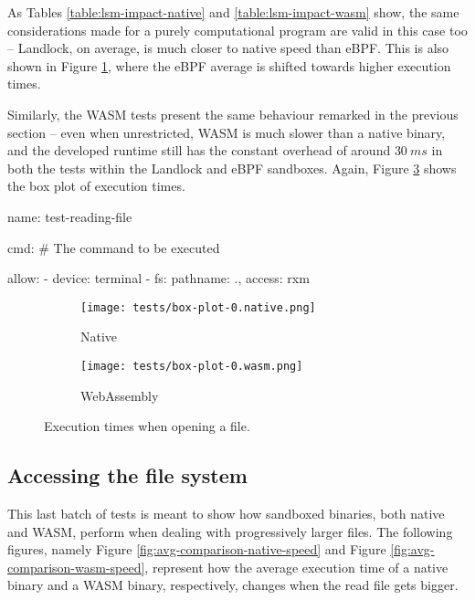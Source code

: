 As Tables \ref{table:lsm-impact-native} and \ref{table:lsm-impact-wasm} show,
the same considerations made for a purely computational program are valid in this case too
-- Landlock, on average, is much closer to native speed than eBPF.
This is also shown in Figure \ref{fig:distribution-opening-native}, where the eBPF average is shifted towards
higher execution times.

Similarly, the WASM tests present the same behaviour remarked in the previous section --
even when unrestricted, WASM is much slower than a native binary, and the developed runtime
still has the constant overhead of around $30\ ms$ in both the tests within the Landlock and eBPF sandboxes.
Again, Figure \ref{fig:distribution-opening-wasm} shows the box plot of execution times.

\vspace*{1cm}

\begin{code}[language=yaml, caption=The outline of the policy used for testing the reading program., label=lst:outline-policy-reading-test]
name: test-reading-file

cmd: # The command to be executed

allow:
  - device: terminal
  - fs: {pathname: ., access: rxm}
\end{code}

\clearpage
\begin{figure}[ht]
  \centering
  \begin{subfigure}[b]{0.49\linewidth}
    \centering
    \texttt{[image: tests/box-plot-0.native.png]}
    \caption{Native}
    \label{fig:distribution-opening-native}
  \end{subfigure}
  \begin{subfigure}[b]{0.49\linewidth}
    \centering
    \texttt{[image: tests/box-plot-0.wasm.png]}
    \caption{WebAssembly}
    \label{fig:distribution-opening-wasm}
  \end{subfigure}

  \caption{Execution times when opening a file.}
\end{figure}

\subsection{Accessing the file system}

This last batch of tests is meant to show how sandboxed binaries, both native and WASM, perform when
dealing with progressively larger files.
The following figures, namely Figure \ref{fig:avg-comparison-native-speed} and Figure \ref{fig:avg-comparison-wasm-speed},
represent how the average execution time of a native binary and a WASM binary, respectively, changes
when the read file gets bigger.

